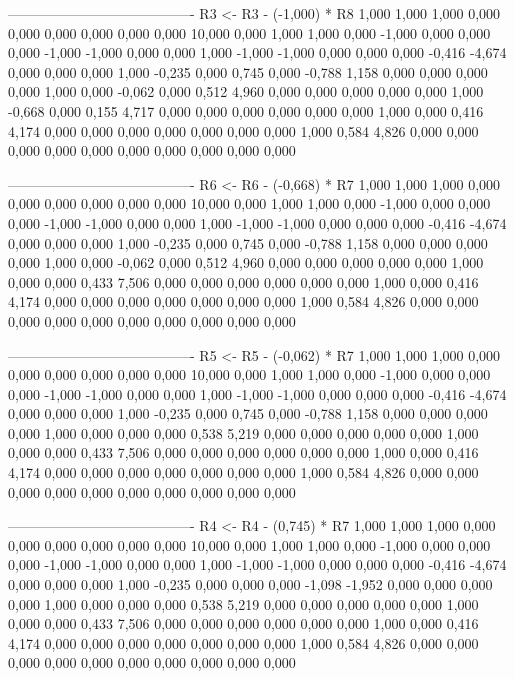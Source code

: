 \documentclass[12pt]{article}
\begin{document}
\begin{enumerate}
\begin{keluaran}
----------------------------------------
R3 <- R3 - (-1,000) * R8
1,000   1,000   1,000   0,000   0,000   0,000   0,000   0,000   0,000   10,000
0,000   1,000   1,000   0,000   -1,000  0,000   0,000   0,000   -1,000  -1,000
0,000   0,000   1,000   -1,000  -1,000  0,000   0,000   0,000   -0,416  -4,674
0,000   0,000   0,000   1,000   -0,235  0,000   0,745   0,000   -0,788  1,158
0,000   0,000   0,000   0,000   1,000   0,000   -0,062  0,000   0,512   4,960
0,000   0,000   0,000   0,000   0,000   1,000   -0,668  0,000   0,155   4,717
0,000   0,000   0,000   0,000   0,000   0,000   1,000   0,000   0,416   4,174
0,000   0,000   0,000   0,000   0,000   0,000   0,000   1,000   0,584   4,826
0,000   0,000   0,000   0,000   0,000   0,000   0,000   0,000   0,000   0,000

----------------------------------------
R6 <- R6 - (-0,668) * R7
1,000   1,000   1,000   0,000   0,000   0,000   0,000   0,000   0,000   10,000
0,000   1,000   1,000   0,000   -1,000  0,000   0,000   0,000   -1,000  -1,000
0,000   0,000   1,000   -1,000  -1,000  0,000   0,000   0,000   -0,416  -4,674
0,000   0,000   0,000   1,000   -0,235  0,000   0,745   0,000   -0,788  1,158
0,000   0,000   0,000   0,000   1,000   0,000   -0,062  0,000   0,512   4,960
0,000   0,000   0,000   0,000   0,000   1,000   0,000   0,000   0,433   7,506
0,000   0,000   0,000   0,000   0,000   0,000   1,000   0,000   0,416   4,174
0,000   0,000   0,000   0,000   0,000   0,000   0,000   1,000   0,584   4,826
0,000   0,000   0,000   0,000   0,000   0,000   0,000   0,000   0,000   0,000

----------------------------------------
R5 <- R5 - (-0,062) * R7
1,000   1,000   1,000   0,000   0,000   0,000   0,000   0,000   0,000   10,000
0,000   1,000   1,000   0,000   -1,000  0,000   0,000   0,000   -1,000  -1,000
0,000   0,000   1,000   -1,000  -1,000  0,000   0,000   0,000   -0,416  -4,674
0,000   0,000   0,000   1,000   -0,235  0,000   0,745   0,000   -0,788  1,158
0,000   0,000   0,000   0,000   1,000   0,000   0,000   0,000   0,538   5,219
0,000   0,000   0,000   0,000   0,000   1,000   0,000   0,000   0,433   7,506
0,000   0,000   0,000   0,000   0,000   0,000   1,000   0,000   0,416   4,174
0,000   0,000   0,000   0,000   0,000   0,000   0,000   1,000   0,584   4,826
0,000   0,000   0,000   0,000   0,000   0,000   0,000   0,000   0,000   0,000

----------------------------------------
R4 <- R4 - (0,745) * R7
1,000   1,000   1,000   0,000   0,000   0,000   0,000   0,000   0,000   10,000
0,000   1,000   1,000   0,000   -1,000  0,000   0,000   0,000   -1,000  -1,000
0,000   0,000   1,000   -1,000  -1,000  0,000   0,000   0,000   -0,416  -4,674
0,000   0,000   0,000   1,000   -0,235  0,000   0,000   0,000   -1,098  -1,952
0,000   0,000   0,000   0,000   1,000   0,000   0,000   0,000   0,538   5,219
0,000   0,000   0,000   0,000   0,000   1,000   0,000   0,000   0,433   7,506
0,000   0,000   0,000   0,000   0,000   0,000   1,000   0,000   0,416   4,174
0,000   0,000   0,000   0,000   0,000   0,000   0,000   1,000   0,584   4,826
0,000   0,000   0,000   0,000   0,000   0,000   0,000   0,000   0,000   0,000


\end{keluaran}
\end{enumerate}
\end{document}
